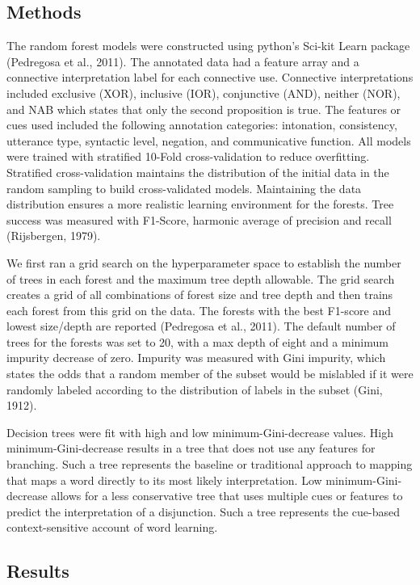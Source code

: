 \documentclass[
  english,
  ,man,floatsintext]{apa6}
\begin{document}
\hypertarget{methods-2}{%
\subsection{Methods}\label{methods-2}}

The random forest models were constructed using python's Sci-kit Learn package (Pedregosa et al., 2011). The annotated data had a feature array and a connective interpretation label for each connective use. Connective interpretations included exclusive (XOR), inclusive (IOR), conjunctive (AND), neither (NOR), and NAB which states that only the second proposition is true. The features or cues used included the following annotation categories: intonation, consistency, utterance type, syntactic level, negation, and communicative function. All models were trained with stratified 10-Fold cross-validation to reduce overfitting. Stratified cross-validation maintains the distribution of the initial data in the random sampling to build cross-validated models. Maintaining the data distribution ensures a more realistic learning environment for the forests. Tree success was measured with F1-Score, harmonic average of precision and recall (Rijsbergen, 1979).

We first ran a grid search on the hyperparameter space to establish the number of trees in each forest and the maximum tree depth allowable. The grid search creates a grid of all combinations of forest size and tree depth and then trains each forest from this grid on the data. The forests with the best F1-score and lowest size/depth are reported (Pedregosa et al., 2011). The default number of trees for the forests was set to 20, with a max depth of eight and a minimum impurity decrease of zero. Impurity was measured with Gini impurity, which states the odds that a random member of the subset would be mislabled if it were randomly labeled according to the distribution of labels in the subset (Gini, 1912).

Decision trees were fit with high and low minimum-Gini-decrease values. High minimum-Gini-decrease results in a tree that does not use any features for branching. Such a tree represents the baseline or traditional approach to mapping that maps a word directly to its most likely interpretation. Low minimum-Gini-decrease allows for a less conservative tree that uses multiple cues or features to predict the interpretation of a disjunction. Such a tree represents the cue-based context-sensitive account of word learning.

\hypertarget{results-1}{%
\subsection{Results}\label{results-1}}
\end{document}
